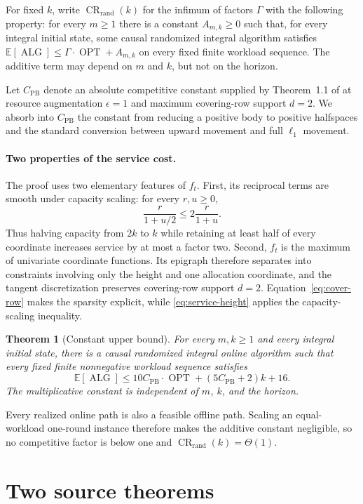 \documentclass[11pt]{article}
\newtheorem{theorem}{Theorem}
\theoremstyle{remark}
\newcommand{\E}{\mathbb E}
\newcommand{\OPT}{\operatorname{OPT}}
\newcommand{\ALG}{\operatorname{ALG}}
\newcommand{\CPB}{C_{\mathrm{PB}}}
\begin{document}
For fixed $k$, write $\operatorname{CR}_{\mathrm{rand}}(k)$ for the infimum of
factors $\Gamma$ with the following property: for every $m\geq1$ there is a
constant $A_{m,k}\geq0$ such that, for every integral initial state, some causal
randomized integral algorithm satisfies
$\E[\ALG]\leq\Gamma\cdot\OPT+A_{m,k}$ on every fixed finite workload sequence.
The additive term may depend on $m$ and $k$, but not on the horizon.

Let $\CPB$ denote an absolute competitive constant supplied by Theorem~1.1 of
\cite{BBLS2023} at resource augmentation $\epsilon=1$ and maximum covering-row
support $d=2$.  We absorb into $\CPB$ the constant from reducing a positive body
to positive halfspaces and the standard conversion between upward movement and
full $\ell_1$ movement.

\paragraph{Two properties of the service cost.}
The proof uses two elementary features of $f_t$.  First, its reciprocal terms
are smooth under capacity scaling: for every $r,u\geq0$,
\[
 \frac{r}{1+u/2}\leq2\frac{r}{1+u}.
\]
Thus halving capacity from $2k$ to $k$ while retaining at least half of every
coordinate increases service by at most a factor two.  Second, $f_t$ is the
maximum of univariate coordinate functions.  Its epigraph therefore separates
into constraints involving only the height and one allocation coordinate, and
the tangent discretization preserves covering-row support $d=2$.
Equation~\eqref{eq:cover-row} makes the sparsity explicit, while
\eqref{eq:service-height} applies the capacity-scaling inequality.

\begin{theorem}[Constant upper bound]\label{thm:upper}
For every $m,k\geq1$ and every integral initial state, there is a causal
randomized integral online algorithm such that every fixed finite nonnegative
workload sequence satisfies
\[
 \E[\ALG]
 \leq 10\CPB\cdot\OPT+(5\CPB+2)k+16.
\]
The multiplicative constant is independent of $m$, $k$, and the horizon.
\end{theorem}

Every realized online path is also a feasible offline path.  Scaling an
equal-workload one-round instance therefore makes the additive constant
negligible, so no competitive factor is below one and
$\operatorname{CR}_{\mathrm{rand}}(k)=\Theta(1)$.

\section{Two source theorems}
\end{document}
